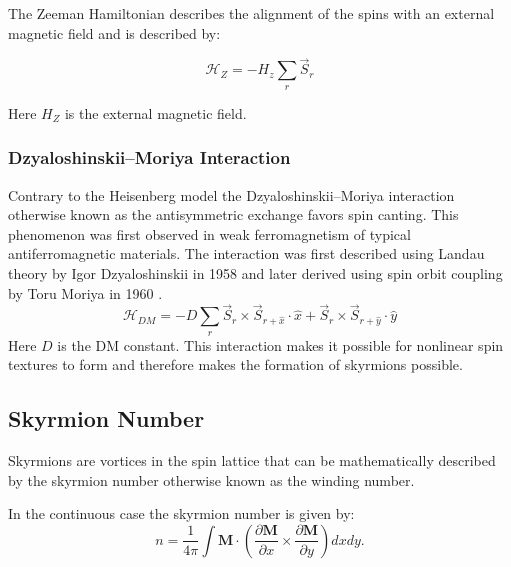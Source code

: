The Zeeman Hamiltonian describes the alignment of the spins with an external magnetic field and is described by:

\begin{equation}
	 \mathcal{H}_{Z} = - H_z \sum_r \vec{S}_r 
\end{equation}

Here $H_Z$ is the external magnetic field. 



\subsubsection{Dzyaloshinskii–Moriya Interaction}
Contrary  to the Heisenberg model the Dzyaloshinskii–Moriya interaction otherwise known as the antisymmetric exchange favors spin canting. 
This phenomenon was first observed in weak ferromagnetism of typical antiferromagnetic materials.
The interaction was first described using Landau theory by  Igor Dzyaloshinskii in 1958 \cite{Dzyaloshinsky1958ATT} and later derived using spin orbit coupling by Toru Moriya in 1960 \cite{PhysRev.120.91}.
\begin{equation}
	\mathcal{H}_{DM} = -D \sum_r \vec{S}_r \times \vec{S}_{r + \hat{x}} \cdot \hat{x} + \vec{S}_r \times \vec{S}_{r + \hat{y}} \cdot \hat{y}
\end{equation}
Here $D$ is the DM constant. This interaction makes it possible for nonlinear spin textures to form and therefore makes the formation of skyrmions possible.


\subsection{Skyrmion Number}\label{model_skyrmion_number}
Skyrmions are vortices in the spin lattice that can be mathematically described by the skyrmion number otherwise known as the winding number. 

In the continuous case the skyrmion number is given by:
\begin{equation}
	 n = \frac{1}{4\pi} \int \mathbf{M} \cdot \left( \frac{\partial \mathbf{M}}{\partial x}  \times \frac{\partial \mathbf{M}}{\partial y}\right) dx dy.
\end{equation}

